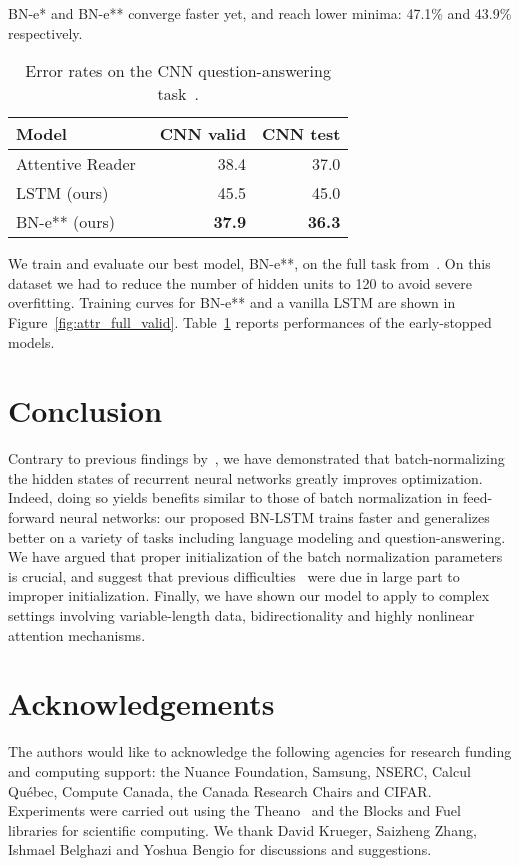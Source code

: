 \documentclass{article} \pdfoutput=1 \usepackage[utf8]{inputenc}
\begin{document}
BN-e* and BN-e** converge faster yet, and reach lower minima: 47.1\% and 43.9\%
respectively.

\begin{table}[!hb]
  \center
  \begin{tabular}{@{}lrr@{}}
  \toprule
  \bf Model & \bf CNN valid & \bf CNN test \\
  \midrule
  Attentive Reader~\citep{attentivereader} & 38.4 & 37.0 \\
  \midrule
  LSTM (ours) & 45.5 & 45.0 \\
  BN-e** (ours) & \textbf{37.9} & \textbf{36.3} \\
  \bottomrule
\end{tabular}
\caption{Error rates on the CNN question-answering task~\citet{attentivereader}.}
\label{tab:attr_full}
\end{table}

We train and evaluate our best model, BN-e**, on the full task from~\citep{attentivereader}.
On this dataset we had to reduce the number of hidden units to 120 to avoid severe overfitting.
Training curves for BN-e** and a vanilla LSTM are shown in Figure~\ref{fig:attr_full_valid}.
Table~\ref{tab:attr_full} reports performances of the early-stopped models.

\section{Conclusion}

Contrary to previous findings by~\citet{cesar,baidu}, we have demonstrated that
batch-normalizing the hidden states of recurrent neural networks greatly
improves optimization.  Indeed, doing so yields benefits similar to those of
batch normalization in feed-forward neural networks: our proposed BN-LSTM
trains faster and generalizes better on a variety of tasks including language
modeling and question-answering.  We have argued that proper initialization of
the batch normalization parameters is crucial, and suggest that previous
difficulties~\citep{cesar, baidu} were due in large part to improper
initialization.  Finally, we have shown our model to apply to complex settings
involving variable-length data, bidirectionality and highly nonlinear attention
mechanisms.

\section*{Acknowledgements}

The authors would like to acknowledge the following agencies for
research funding and computing support: the Nuance Foundation, Samsung, NSERC, Calcul Qu\'{e}bec, Compute Canada,
the Canada Research Chairs and CIFAR.
Experiments were carried out using the Theano~\citep{theano} and the
Blocks and Fuel~\citep{blocks} libraries for scientific computing.
We thank David Krueger, Saizheng Zhang, Ishmael Belghazi and Yoshua Bengio for discussions and suggestions.
\end{document}
